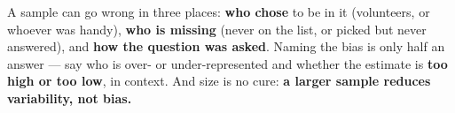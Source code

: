 \documentclass[12pt]{article}
\begin{document}
\vspace{0.14in}

\boxguard[8]
\begin{remindbox}
\small
A sample can go wrong in three places: \textbf{who chose} to be in it (volunteers, or whoever
was handy), \textbf{who is missing} (never on the list, or picked but never answered), and
\textbf{how the question was asked}. Naming the bias is only half an answer --- say who is
over- or under-represented and whether the estimate is \textbf{too high or too low}, in
context. And size is no cure: \textbf{a larger sample reduces variability, not bias.}
\end{remindbox}
\end{document}
